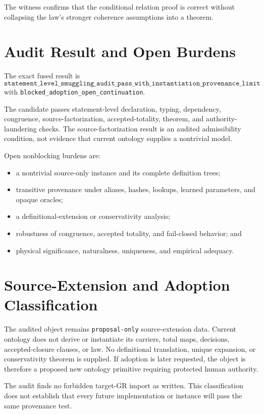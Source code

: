 \documentclass[11pt]{article}
\begin{document}
The witness confirms that the conditional relation proof is correct without
collapsing the law's stronger coherence assumptions into a theorem.

\section{Audit Result and Open Burdens}

The exact fused result is
\[
\boxed{\texttt{
statement\_level\_smuggling\_audit\_pass\_with\_
instantiation\_provenance\_limit}}
\]
with \texttt{blocked\_adoption\_open\_continuation}.

The candidate passes statement-level declaration, typing, dependency,
congruence, source-factorization, accepted-totality, theorem, and
authority-laundering checks. The source-factorization result is an audited
admissibility condition, not evidence that current ontology supplies a
nontrivial model.

Open nonblocking burdens are:
\begin{itemize}[leftmargin=*]
  \item a nontrivial source-only instance and its complete definition trees;
  \item transitive provenance under aliases, hashes, lookups, learned
  parameters, and opaque oracles;
  \item a definitional-extension or conservativity analysis;
  \item robustness of congruence, accepted totality, and fail-closed behavior;
  and
  \item physical significance, naturalness, uniqueness, and empirical
  adequacy.
\end{itemize}

\section{Source-Extension and Adoption Classification}

The audited object remains \texttt{proposal-only} source-extension data.
Current ontology does not derive or instantiate its carriers, total maps,
decisions, accepted-closure clauses, or law. No definitional translation,
unique expansion, or conservativity theorem is supplied. If adoption is later
requested, the object is therefore a proposed new ontology primitive requiring
protected human authority.

The audit finds no forbidden target-GR import as written. This classification
does not establish that every future implementation or instance will pass the
same provenance test.
\end{document}
